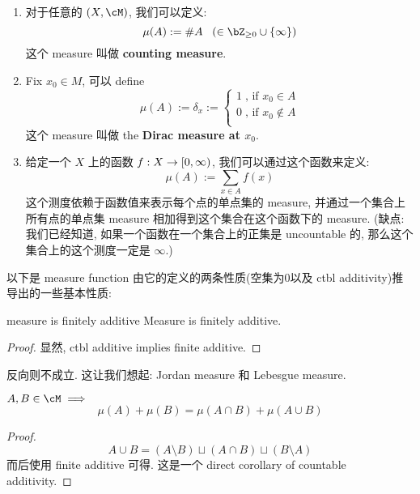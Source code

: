 \documentclass[lang=cn,11pt]{elegantbook}
\begin{document}
\begin{example}
\begin{enumerate}
    \item 对于任意的 $(X, \cM)$, 我们可以定义:
    $$
    \mu(A) := \#A \;\;\;(\in \bZ_{\geq 0} \cup \{\infty \})
    $$
    这个 measure 叫做 \textbf{counting measure}.
    \item 
    Fix $x_0 \in M$, 可以 define
    $$
    \mu(A) := \delta_x := \begin{cases}
        1 \; \text{, if } x_0 \in A \\
        0 \; \text{, if } x_0 \not\in A \\
    \end{cases}
    $$
    这个 measure 叫做 the \textbf{Dirac measure at $x_0$}.
    \item 
    给定一个 $X$ 上的函数 $f: X \rightarrow [0, \infty)$, 我们可以通过这个函数来定义:
    $$
    \mu(A) := \sum_{x \in A} f(x)
    $$
    这个测度依赖于函数值来表示每个点的单点集的 measure, 并通过一个集合上所有点的单点集 measure 相加得到这个集合在这个函数下的 measure. (缺点: 我们已经知道, 如果一个函数在一个集合上的正集是 uncountable 的, 那么这个集合上的这个测度一定是 $\infty$.)
    \end{enumerate}
\end{example}



\noindent 以下是 measure function 由它的定义的两条性质(空集为0以及 ctbl additivity)推导出的一些基本性质:

\begin{lemma}{measure is finitely additive}
    Measure is finitely additive.
\end{lemma}
\begin{proof}
    显然, ctbl additive implies finite additive.
\end{proof}

\begin{remark}
    反向则不成立. 这让我们想起: Jordan measure 和 Lebesgue measure. 
\end{remark}

\begin{lemma}
    $A,B\in \cM \implies$
    $$
    \mu(A) + \mu(B) = \mu(A \cap B) + \mu(A \cup B)
    $$
\end{lemma}
\begin{proof}
    $$A \cup B = (A \setminus B) \sqcup (A\cap B) \sqcup (B\setminus A)$$
    而后使用 finite additive 可得. 这是一个 direct corollary of countable additivity.
\end{proof}
\end{document}
